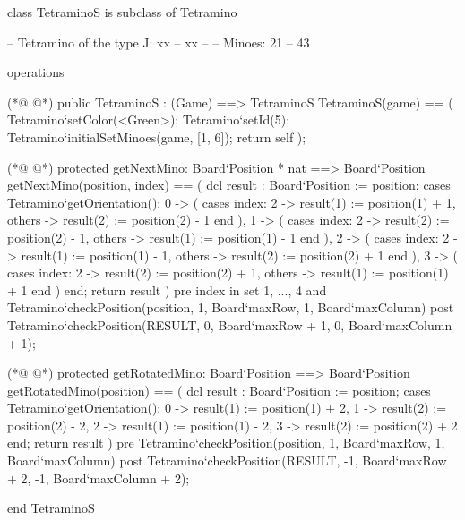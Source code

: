 \begin{vdmpp}[breaklines=true]
class TetraminoS is subclass of Tetramino
  
 -- Tetramino of the type J:  xx
 --        xx
 --
 -- Minoes:       21
 --        43
 
 
 operations
 
(*@
\label{TetraminoS:12}
@*)
  public TetraminoS : (Game) ==> TetraminoS
  TetraminoS(game) == (
   Tetramino`setColor(<Green>);
   Tetramino`setId(5);
   Tetramino`initialSetMinoes(game, [1, 6]);
   return self
  );
   
(*@
\label{getNextMino:20}
@*)
  protected getNextMino: Board`Position * nat ==> Board`Position
  getNextMino(position, index) == (
   dcl result : Board`Position := position;
   cases Tetramino`getOrientation():
    0 -> (
     cases index:
      2 -> result(1) := position(1) + 1,
      others -> result(2) := position(2) - 1
     end
    ),
    1 -> (
     cases index:
      2 -> result(2) := position(2) - 1,
      others -> result(1) := position(1) - 1
     end
    ),
    2 -> (
     cases index:
      2 -> result(1) := position(1) - 1,
      others -> result(2) := position(2) + 1
     end
    ),
    3 -> (
     cases index:
      2 -> result(2) := position(2) + 1,
      others -> result(1) := position(1) + 1
     end
    )
   end;
   return result
  )
  pre index in set {1, ..., 4} 
   and Tetramino`checkPosition(position, 1, Board`maxRow, 1, Board`maxColumn)
  post Tetramino`checkPosition(RESULT, 0, Board`maxRow + 1, 0, Board`maxColumn + 1);
   
(*@
\label{getRotatedMino:55}
@*)
  protected getRotatedMino: Board`Position ==> Board`Position
  getRotatedMino(position) == (
   dcl result : Board`Position := position;
   cases Tetramino`getOrientation():
    0 -> result(1) := position(1) + 2,
    1 -> result(2) := position(2) - 2,
    2 -> result(1) := position(1) - 2,
    3 -> result(2) := position(2) + 2
   end;
   return result
  )
  pre Tetramino`checkPosition(position, 1, Board`maxRow, 1, Board`maxColumn)
  post Tetramino`checkPosition(RESULT, -1, Board`maxRow + 2, -1, Board`maxColumn + 2);

end TetraminoS
\end{vdmpp}
